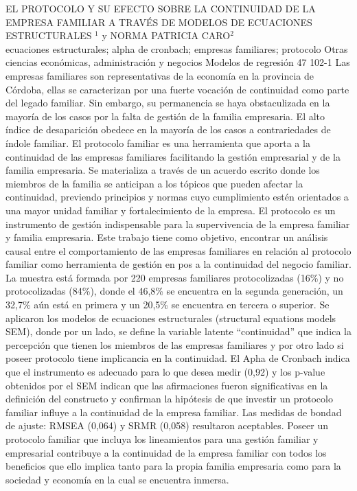\A
{EL PROTOCOLO Y SU EFECTO SOBRE LA CONTINUIDAD DE LA EMPRESA FAMILIAR A TRAVÉS DE MODELOS DE ECUACIONES ESTRUCTURALES}
{$^1$ y NORMA PATRICIA CARO$^2$}
{
\\}
{ecuaciones estructurales; alpha de cronbach; empresas familiares; protocolo} 
 {Otras ciencias económicas, administración y negocios} 
 {Modelos de regresión} 
 {47} 
 {102-1}
{Las empresas familiares son representativas de la economía en la provincia de Córdoba, ellas se caracterizan por una fuerte vocación de continuidad como parte del legado familiar. Sin embargo, su permanencia se haya obstaculizada en la mayoría de los casos por la falta de gestión de la familia empresaria. El alto índice de desaparición obedece en la mayoría de los casos a contrariedades de índole familiar. El protocolo familiar es una herramienta que aporta a la continuidad de las empresas familiares facilitando la gestión empresarial y de la familia empresaria. Se materializa a través de un acuerdo escrito donde los miembros de la familia se anticipan a los tópicos que pueden afectar la continuidad, previendo principios y normas cuyo cumplimiento estén orientados a una mayor unidad familiar y fortalecimiento de la empresa. El protocolo es un instrumento de gestión indispensable para la supervivencia de la empresa familiar y familia empresaria. Este trabajo tiene como objetivo, encontrar un análisis causal entre el comportamiento de las empresas familiares en relación al protocolo familiar como herramienta de gestión en pos a la continuidad del negocio familiar. La muestra está formada por 220 empresas familiares protocolizadas (16\%) y no protocolizadas (84\%), donde el 46,8\% se encuentra en la segunda generación, un 32,7\% aún está en primera y un 20,5\% se encuentra en tercera o superior. Se aplicaron los modelos de ecuaciones estructurales (structural equations models SEM), donde por un lado, se define la variable latente “continuidad” que indica la percepción que tienen los miembros de las empresas familiares y por otro lado si poseer protocolo tiene implicancia en la continuidad. El Apha de Cronbach indica que el instrumento es adecuado para lo que desea medir (0,92) y los p-value obtenidos por el SEM indican que las afirmaciones fueron significativas en la definición del constructo y confirman la hipótesis de que investir un protocolo familiar influye a la continuidad de la empresa familiar. Las medidas de bondad de ajuste: RMSEA (0,064) y SRMR (0,058) resultaron aceptables. Poseer un protocolo familiar que incluya los lineamientos para una gestión familiar y empresarial contribuye a la continuidad de la empresa familiar con todos los beneficios que ello implica tanto para la propia familia empresaria como para la sociedad y economía en la cual se encuentra inmersa.}
